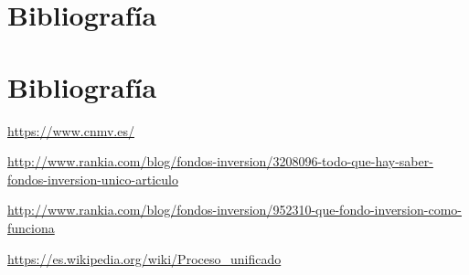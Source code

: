 \documentclass[12pt, a4paper]{article}
\newcommand*\parttitle{}
\let\origpart\part
\renewcommand*{\part}[2][]{%
	\ifx\\#1\\%
	\origpart{#2}%
	\renewcommand*\parttitle{#2}%
	\else
	\origpart[#1]{#2}%
	\renewcommand*\parttitle{#1}%
	\fi
}
\begin{document}
\newpage

\part{Bibliografía}

\begin{thebibliography}{10}
	
	\bibitem[CNMV]{}
	\newline
	\href{https://www.cnmv.es/}{https://www.cnmv.es/}
	
	\bibitem[Rankia]{}
	\newline
	\href{http://www.rankia.com/blog/fondos-inversion/3208096-todo-que-hay-saber-fondos-inversion-unico-articulo}{http://www.rankia.com/blog/fondos-inversion/3208096-todo-que-hay-saber-fondos-inversion-unico-articulo}
	
	\bibitem[Rankia]{}
	\newline
	\href{http://www.rankia.com/blog/fondos-inversion/952310-que-fondo-inversion-como-funciona}{http://www.rankia.com/blog/fondos-inversion/952310-que-fondo-inversion-como-funciona}
	
	\bibitem[Wikipedia]{}
	\newline
	\href{https://es.wikipedia.org/wiki/Proceso\_unificado}{https://es.wikipedia.org/wiki/Proceso\_unificado}
	
\end{thebibliography}
\newpage
{}
\printglossary[type=\acronymtype]
\end{document}
